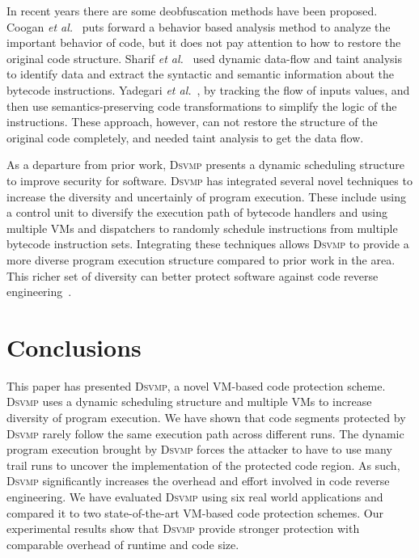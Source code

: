\documentclass[preprint,12pt,3p]{elsarticle}
\newcommand{\DSVMP}{\textsc{Dsvmp}\xspace}
\begin{document}
In recent years there are some deobfuscation methods have been proposed.
Coogan \emph{et al.}~\cite{coogan2011deobfuscation} puts forward a behavior based analysis method to analyze the important behavior of code, but it does not pay attention to how to restore the original code structure.
Sharif \emph{et al.}~\cite{sharif2009automatic} used dynamic data-flow and taint analysis to identify data and extract the syntactic and semantic information about the bytecode instructions.
Yadegari \emph{et al.}~\cite{Yadegari2015A}, by tracking the flow of inputs values, and then use semantics-preserving code transformations to simplify the logic of the instructions.
These approach, however, can not restore the structure of the original code completely, and needed taint analysis to get the data flow.

As a departure from prior work, \DSVMP presents a dynamic scheduling structure to improve security for software.
\DSVMP has integrated several novel techniques to increase the diversity and uncertainly of program execution.
These include using a control unit to diversify the execution path of bytecode handlers and using multiple VMs
and dispatchers to randomly schedule instructions from multiple bytecode instruction sets.
Integrating these techniques allows \DSVMP to provide a more diverse program execution structure compared to prior work in the area.
This richer set of diversity can better protect software against code reverse engineering~\cite{20larsen2014sok}.


\section{Conclusions}\label{sec:con}
This paper has presented \DSVMP, a novel VM-based code protection scheme.
\DSVMP uses a dynamic scheduling structure and multiple VMs to increase
diversity of program execution. We have shown that code
segments protected by \DSVMP rarely follow the same execution path across
different runs. The dynamic program execution brought by \DSVMP forces the attacker
to have to use many trail runs to uncover the implementation of the protected code
region. As such, \DSVMP significantly increases the overhead and effort
involved in code reverse engineering. We have evaluated \DSVMP using six
real world applications and compared it to two state-of-the-art VM-based code
protection schemes. Our experimental results show that \DSVMP provide
stronger protection with comparable overhead of runtime and code size.
\end{document}
